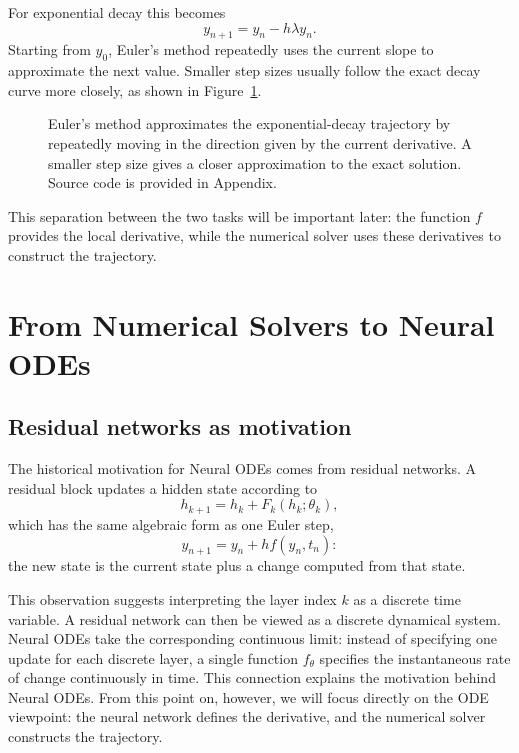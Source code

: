 \documentclass[11pt,a4paper]{article}
\newcommand{\figph}[2]{%
  \fbox{\parbox[c][3.2cm][c]{\dimexpr#1-2\fboxsep-2\fboxrule\relax}{%
    \centering\small\ttfamily [figure: #2]}}}
\begin{document}
For exponential decay this becomes
\begin{equation}
    y_{n+1}=y_n-h\lambda y_n.
\end{equation}
Starting from $y_0$, Euler's method repeatedly uses the current slope to
approximate the next value. Smaller step sizes usually follow the exact decay
curve more closely, as shown in Figure~\ref{fig:euler}.

\begin{figure}[h]
    \centering
    \figph{0.95\textwidth}{fig4\_euler\_decay}
    \caption{Euler's method approximates the exponential-decay trajectory by
    repeatedly moving in the direction given by the current derivative. A
    smaller step size gives a closer approximation to the exact solution. Source code is provided in Appendix.}
    \label{fig:euler}
\end{figure}

This separation between the two tasks will be important later: the function
$f$ provides the local derivative, while the numerical solver uses these
derivatives to construct the trajectory.

\section{From Numerical Solvers to Neural ODEs}

\subsection{Residual networks as motivation}

The historical motivation for Neural ODEs comes from residual networks. A
residual block updates a hidden state according to
\begin{equation}
    h_{k+1}=h_k+F_k(h_k;\theta_k),
\end{equation}
which has the same algebraic form as one Euler step,
\[
    y_{n+1}=y_n+h f(y_n,t_n):
\]
the new state is the current state plus a change computed from that state.

This observation suggests interpreting the layer index $k$ as a discrete time
variable. A residual network can then be viewed as a discrete dynamical system.
Neural ODEs take the corresponding continuous limit: instead of specifying one
update for each discrete layer, a single function $f_\theta$ specifies the
instantaneous rate of change continuously in time. This connection explains the motivation behind Neural ODEs. From this point
on, however, we will focus directly on the ODE viewpoint: the neural network
defines the derivative, and the numerical solver constructs the trajectory.
\end{document}
